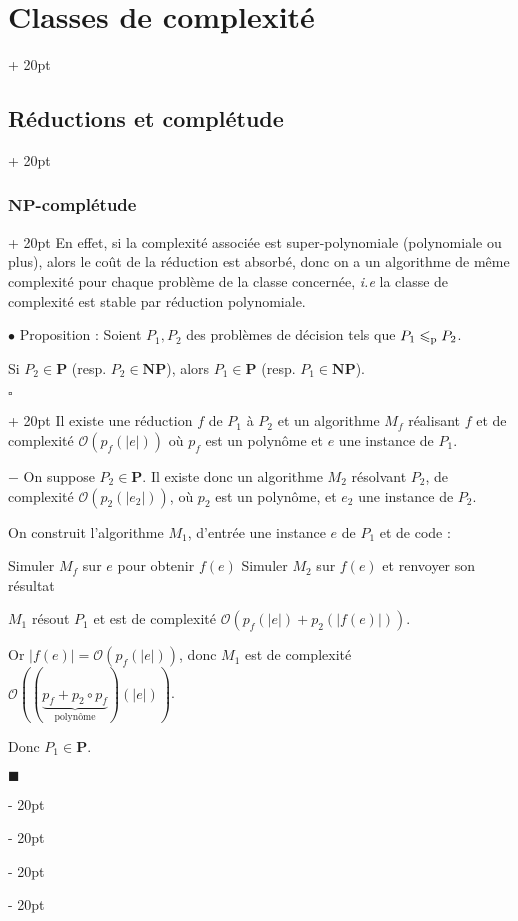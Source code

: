 \documentclass[a4paper, 12pt, twoside]{article}
\newenvironment{indalgo}[2][H]{
    \begin{algoBox}
        \begin{algorithm}[#1]
            \caption{#2}
}
{
        \end{algorithm}
    \end{algoBox}
}
\newcommand{\abs}[1]{\left\lvert #1 \right\rvert}
\renewcommand{\le}{\leqslant}
\newcommand{\ind}[1][20pt]{\advance\leftskip + #1}
\newcommand{\deind}[1][20pt]{\advance\leftskip - #1}
\newenvironment{indt}[2][20pt]{#2 \par \ind[#1]}{\par \deind} %
\newenvironment{proof}[1][{}]{\begin{indt}{$\square$ #1}}{$\blacksquare$ \end{indt}}
\begin{document}
\begin{indt}{\section{Classes de complexité}}
\begin{indt}{\subsection{Réductions et complétude}}
\begin{indt}{\subsubsection{$\mathbf{NP}$-complétude}}
                En effet, si la complexité associée est super-polynomiale (polynomiale ou plus), alors le coût de la réduction est absorbé, donc on a un algorithme de même complexité pour chaque problème de la classe concernée, \textit{i.e} la classe de complexité est stable par réduction polynomiale.

                \vspace{12pt}
                
                $\bullet$ Proposition :
                Soient $P_1, P_2$ des problèmes de décision tels que $P_1 \le_{\rm p} P_2$.

                Si $P_2 \in \mathbf{P}$ (resp. $P_2 \in \mathbf{NP}$), alors $P_1 \in \mathbf P$ (resp. $P_1 \in \mathbf{NP}$).

                \vspace{6pt}
                
                \begin{proof}
                    Il existe une réduction $f$ de $P_1$ à $P_2$ et un algorithme $M_f$ réalisant $f$ et de complexité $\mathcal O(p_f(\abs e))$ où $p_f$ est un polynôme et $e$ une instance de $P_1$.

                    $-$ On suppose $P_2 \in \mathbf P$. Il existe donc un algorithme $M_2$ résolvant $P_2$, de complexité $\mathcal O(p_2(\abs{e_2}))$, où $p_2$ est un polynôme, et $e_2$ une instance de $P_2$.

                    On construit l'algorithme $M_1$, d'entrée une instance $e$ de $P_1$  et de code :
                    \begin{indalgo}{$M_1$}

                        \BlankLine

                        Simuler $M_f$ sur $e$ pour obtenir $f(e)$\;
                        Simuler $M_2$ sur $f(e)$ et renvoyer son résultat\;
                    \end{indalgo}

                    $M_1$ résout $P_1$ et est de complexité $\mathcal O(p_f(\abs e) + p_2(\abs{f(e)}))$.

                    Or $\abs{f(e)} = \mathcal O(p_f(\abs e))$, donc $M_1$ est de complexité $\mathcal O((\underbrace{p_f + p_2 \circ p_f}_{\text{polynôme}})(\abs e))$.

                    Donc $P_1 \in \mathbf P$.

                    \vspace{6pt}
                    

\end{proof}
\end{indt}
\end{indt}
\end{indt}
\end{document}
